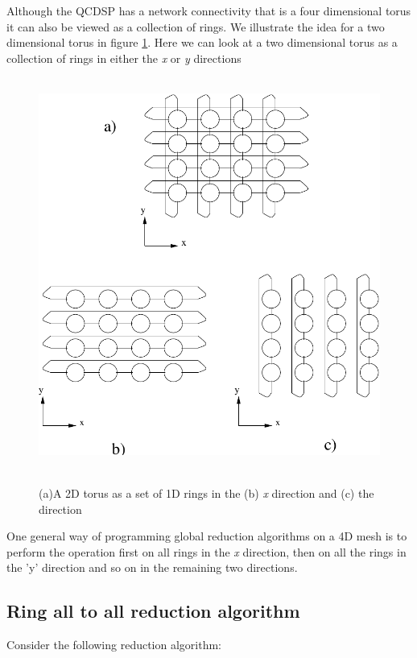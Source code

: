 Although the QCDSP has a network connectivity that is a four dimensional 
torus it can also be viewed as a collection of rings. We illustrate
the idea for a two dimensional torus in figure \ref{f:TorusRing}.
Here we can look at a two dimensional torus as a collection of rings in
either the {\em x} or {\em y} directions
\begin{figure}
\begin{center}
\leavevmode
\hbox{%
\includegraphics{torusRing}
}
\end{center}
\caption{(a)A 2D torus as a set of 1D rings in the (b) {\em x} direction and (c) the {\em} direction}  
\label{f:TorusRing}
\end{figure}

One general way of programming global reduction algorithms on a 4D mesh
is to perform the operation first on all rings in the {\em x} direction,
then on all the rings in the 'y' direction and so on in the remaining two
directions. 

\subsection{Ring all to all reduction algorithm}
Consider the following reduction algorithm:

